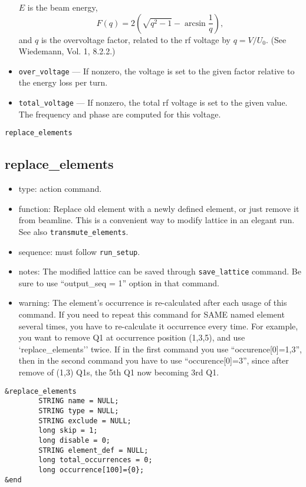 \documentclass[11pt]{article}
\begin{document}
\begin{itemize}
$E$ is the beam energy, 
\begin{equation}
F(q) = 2 \left(\sqrt{q^2-1} - \arcsin \frac{1}{q}\right),
\end{equation}
and $q$ is the overvoltage factor, related to the rf voltage by $q = V/U_0$. (See Wiedemann, Vol. 1, 8.2.2.)
\item \verb|over_voltage| --- If nonzero, the voltage is set to the given factor relative to the 
energy loss per turn.
\item \verb|total_voltage| --- If nonzero, the total rf voltage is set to the given value. The frequency and
  phase are computed for this voltage.
\end{itemize}

\newpage
\begin{center}{\Large\verb|replace_elements|}\end{center}
\subsection{replace\_elements \label{subsec:replaceelements}}

\begin{itemize}
\item type: action command.
\item function: Replace old element with a newly defined element, or just 
   remove it from beamline. This is a convenient way to modify lattice in an elegant run.
   See also \verb|transmute_elements|.
\item sequence: must follow \verb|run_setup|.
\item notes: 
	The modified lattice can be saved through \verb|save_lattice|
   command. Be sure to use ``output\_seq = 1'' option in that command.  
\item warning:
   The element's occurrence is re-calculated after each usage of this command. If 
   you need to repeat this command for SAME named element several times, you have to re-calculate 
   it occurrence every time. For example, you want to remove Q1 at occurrence position 
   (1,3,5), and use 
   `replace\_elements'' twice. If in the first command you use ``occurence[0]=1,3'',
   then in the second command you have to use ``occurence[0]=3'', since after remove of
   (1,3) Q1s, the 5th Q1 now becoming 3rd Q1.
\end{itemize}

\begin{verbatim}
&replace_elements
        STRING name = NULL;
        STRING type = NULL;
        STRING exclude = NULL;
        long skip = 1;
        long disable = 0;
        STRING element_def = NULL;
        long total_occurrences = 0;
        long occurrence[100]={0};
&end
\end{verbatim}
\end{document}
